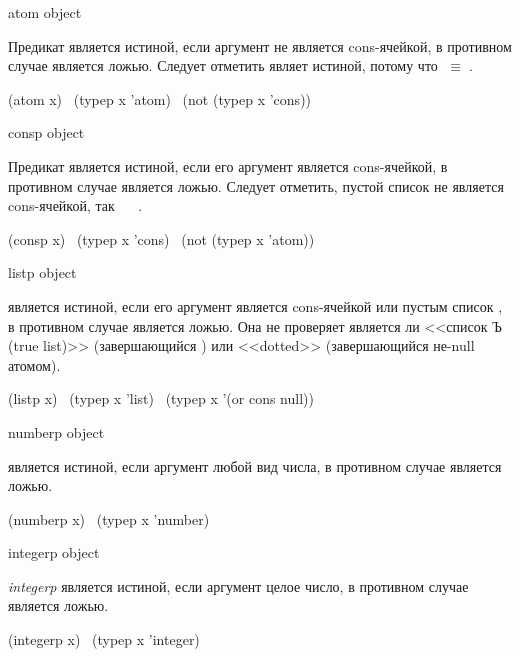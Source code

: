 \begin{defun}[Функция]
atom object

Предикат  является истиной, если аргумент не является cons-ячейкой, в
противном случае является ложью.
Следует отметить  являет истиной, потому что
{\emptylist}$\;\equiv\;${\nil}.
\begin{lisp}
(atom x) \EQ\ (typep x 'atom) \EQ\ (not (typep x 'cons))
\end{lisp}
\end{defun}

\begin{defun}[Функция]
consp object

Предикат  является истиной, если его аргумент является cons-ячейкой,
в противном случае является ложью.
Следует отметить, пустой список не является cons-ячейкой, так 
 \EQ\  \EV\ {\nil}. 
\begin{lisp}
(consp x) \EQ\ (typep x 'cons) \EQ\ (not (typep x 'atom))
\end{lisp}
\end{defun}

\begin{defun}[Функция]
listp object

 является истиной, если его аргумент является cons-ячейкой или пустым
список {\emptylist}, в противном случае является ложью. Она не проверяет
является ли <<список Ъ (true list)>> (завершающийся {\nil}) или <<dotted>>
(завершающийся не-null атомом).
\begin{lisp}
(listp x) \EQ\ (typep x 'list) \EQ\ (typep x '(or cons null))
\end{lisp}
\end{defun}

\begin{defun}[Функция]
numberp object

 является истиной, если аргумент любой вид числа, в
противном случае является ложью.
\begin{lisp}
(numberp x) \EQ\ (typep x 'number)
\end{lisp}
\end{defun}

\begin{defun}[Функция]
integerp object

\emph{integerp} является истиной, если аргумент целое число, в противном
случае является ложью.
\begin{lisp}
(integerp x) \EQ\ (typep x 'integer)
\end{lisp}
\end{defun}

